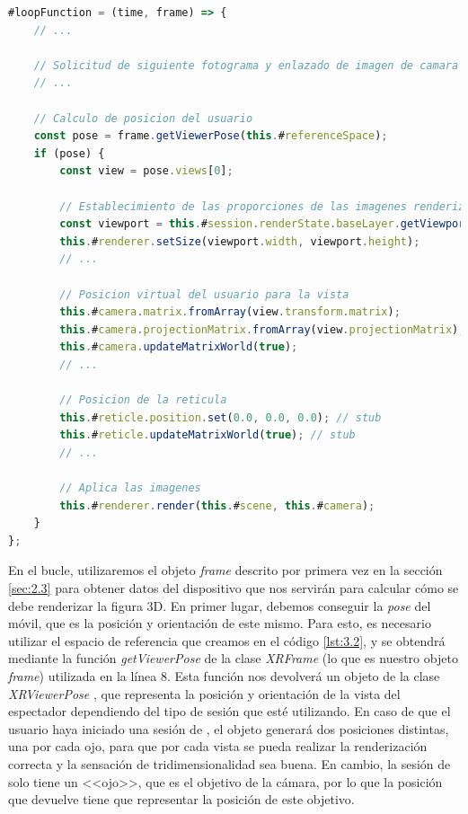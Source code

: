 \documentclass{subfiles}
\begin{document}
        \begin{lstlisting}[language=JavaScript, caption={Uso de la librería Three.js durante el bucle de renderizado.}, label={lst:3.3}]
#loopFunction = (time, frame) => {
    // ...
    
    // Solicitud de siguiente fotograma y enlazado de imagen de camara con modelo
    // ...
    
    // Calculo de posicion del usuario
    const pose = frame.getViewerPose(this.#referenceSpace);
    if (pose) {
        const view = pose.views[0];
        
        // Establecimiento de las proporciones de las imagenes renderizadas
        const viewport = this.#session.renderState.baseLayer.getViewport(view);
        this.#renderer.setSize(viewport.width, viewport.height);
        // ...
        
        // Posicion virtual del usuario para la vista
        this.#camera.matrix.fromArray(view.transform.matrix);
        this.#camera.projectionMatrix.fromArray(view.projectionMatrix);
        this.#camera.updateMatrixWorld(true);
        // ...

        // Posicion de la reticula
        this.#reticle.position.set(0.0, 0.0, 0.0); // stub
        this.#reticle.updateMatrixWorld(true); // stub
        // ...
        
        // Aplica las imagenes
        this.#renderer.render(this.#scene, this.#camera);
    }
};
\end{lstlisting}

        En el bucle, utilizaremos el objeto \textit{frame} descrito por primera vez en la sección \ref{sec:2.3} para obtener datos del dispositivo que nos servirán para calcular cómo se debe renderizar la figura 3D. En primer lugar, debemos conseguir la \textit{pose} del móvil, que es la posición y orientación de este mismo. Para esto, es necesario utilizar el espacio de referencia que creamos en el código \ref{lst:3.2}, y se obtendrá mediante la función \textit{getViewerPose} de la clase \textit{XRFrame} (lo que es nuestro objeto \textit{frame}) utilizada en la línea 8. Esta función nos devolverá un objeto de la clase \textit{XRViewerPose} \cite{web:mozilla_xrviewerpose}, que representa la posición y orientación de la vista del espectador dependiendo del tipo de sesión que esté utilizando. En caso de que el usuario haya iniciado una sesión de \rv, el objeto generará dos posiciones distintas, una por cada ojo, para que por cada vista se pueda realizar la renderización correcta y la sensación de tridimensionalidad sea buena. En cambio, la sesión de \ra solo tiene un <<ojo>>, que es el objetivo de la cámara, por lo que la posición que devuelve tiene que representar la posición de este objetivo.
\end{document}

